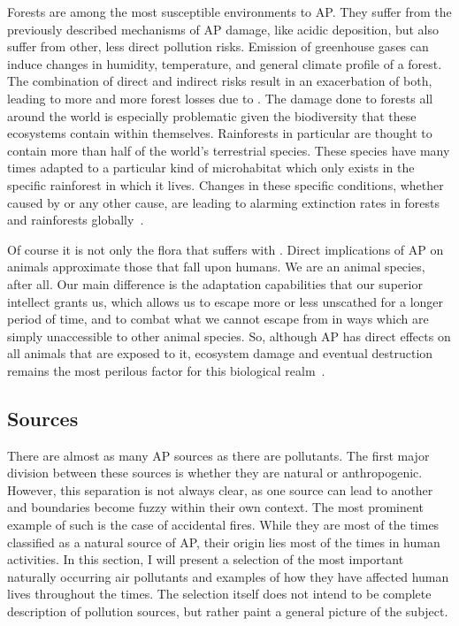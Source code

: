 Forests are among the most susceptible environments to \gls{AP}. They
suffer from the previously described mechanisms of \gls{AP} damage, like
acidic deposition, but also suffer from other, less direct pollution
risks. Emission of greenhouse gases can induce changes in humidity,
temperature, and general climate profile of a forest. The combination of
direct and indirect risks result in an exacerbation of both, leading to
more and more forest losses due to . The damage done to
forests all around the world is especially problematic given the
biodiversity that these ecosystems contain within themselves.
Rainforests in particular are thought to contain more than half of the
world's terrestrial species. These species have many times adapted to a
particular kind of microhabitat which only exists in the specific
rainforest in which it lives. Changes in these specific conditions,
whether caused by  or any other cause, are leading to
alarming extinction rates in forests and rainforests
globally~\cite{Vallero2014, Lovett2009}.

Of course it is not only the flora that suffers with .
Direct implications of \gls{AP} on animals approximate those that fall
upon humans. We are an animal species, after all. Our main difference is
the adaptation capabilities that our superior intellect grants us, which
allows us to escape more or less unscathed for a longer period of time,
and to combat what we cannot escape from in ways which are simply
unaccessible to other animal species. So, although \gls{AP} has direct
effects on all animals that are exposed to it, ecosystem damage and
eventual destruction remains the most perilous factor for this
biological realm~\cite{Vallero2014, Lovett2009}.





\subsection{ Sources}%
\label{sub:ap_sources}

There are almost as many \gls{AP} sources as there are pollutants. The
first major division between these sources is whether they are natural
or anthropogenic. However, this separation is not always clear, as one
source can lead to another and boundaries become fuzzy within their own
context. The most prominent example of such is the case of accidental
fires. While they are most of the times classified as a natural source
of \gls{AP}, their origin lies most of the times in human activities. In
this section, I will present a selection of the most important naturally
occurring air pollutants and examples of how they have affected human
lives throughout the times. The selection itself does not intend to be
complete description of pollution sources, but rather paint a general
picture of the subject.

